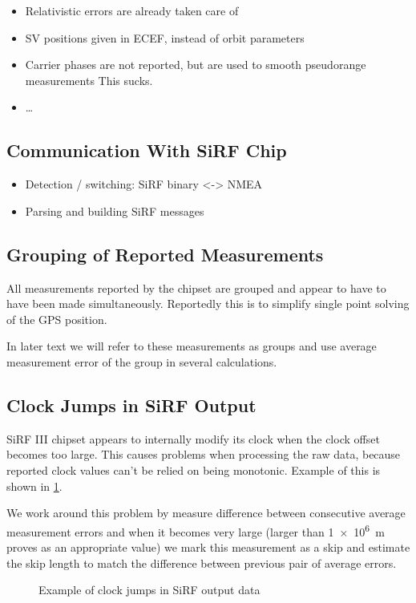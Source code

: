\begin{itemize}
\item Relativistic errors are already taken care of 
\item SV positions given in ECEF, instead of orbit parameters
\item Carrier phases are not reported, but are used to smooth pseudorange measurements
    This sucks.
\item \ldots
\end{itemize}

\subsection{Communication With SiRF Chip}
\begin{itemize}
\item Detection / switching: SiRF binary <-> NMEA
\item Parsing and building SiRF messages
\end{itemize}

\subsection{Grouping of Reported Measurements}
All measurements reported by the chipset are grouped and appear
to have to have been made simultaneously.
Reportedly this is to simplify single point solving of the GPS position.

In later text we will refer to these measurements as groups and use average
measurement error of the group in several calculations.

\subsection{Clock Jumps in SiRF Output}
SiRF III chipset appears to internally modify its clock when the clock offset
becomes too large.
This causes problems when processing the raw data, because reported clock values
can't be relied on being monotonic.
Example of this is shown in \cref{fig:impl-clock-jumps}.

We work around this problem by measure difference between consecutive average
measurement errors and when it becomes very large (larger than \SI{1e6}{\meter} proves as an
appropriate value) we mark this measurement as a skip and estimate the skip
length to match the difference between previous pair of average errors.

\begin{figure}[tp]
	\centering
	\caption{Example of clock jumps in SiRF output data}
	\label{fig:impl-clock-jumps}
\end{figure}

